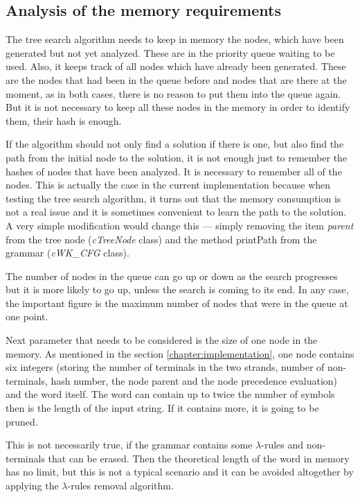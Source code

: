 \subsection{Analysis of the memory requirements}
The tree search algorithm needs to keep in memory the nodes, which have been generated but not yet analyzed. These are in the priority queue waiting to be used. Also, it keeps track of all nodes which have already been generated. These are the nodes that had been in the queue before and nodes that are there at the moment, as in both cases, there is no reason to put them into the queue again. But it is not necessary to keep all these nodes in the memory in order to identify them, their hash is enough.

If the algorithm should not only find a solution if there is one, but also find the path from the initial node to the solution, it is not enough just to remember the hashes of nodes that have been analyzed. It is necessary to remember all of the nodes. This is actually the case in the current implementation because when testing the tree search algorithm, it turns out that the memory consumption is not a real issue and it is sometimes convenient to learn the path to the solution. A very simple modification would change this --- simply removing the item \textit{parent} from the tree node (\textit{cTreeNode} class) and the method printPath from the grammar (\textit{cWK\_CFG} class).

The number of nodes in the queue can go up or down as the search progresses but it is more likely to go up, unless the search is coming to its end. In any case, the important figure is the maximum number of nodes that were in the queue at one point.

Next parameter that needs to be considered is the size of one node in the memory. As mentioned in the section \ref{chapter:implementation}, one node contains six integers (storing the number of terminals in the two strands, number of non-terminals, hash number, the node parent and the node precedence evaluation) and the word itself. The word can contain up to twice the number of symbols then is the length of the input string. If it contains more, it is going to be pruned.

This is not necessarily true, if the grammar contains some $\lambda$-rules and non-terminals that can be erased. Then the theoretical length of the word in memory has no limit, but this is not a typical scenario and it can be avoided altogether by applying the $\lambda$-rules removal algorithm.

